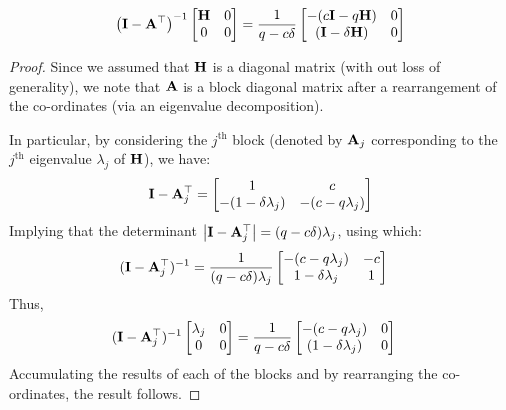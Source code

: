 \begin{lemma}\label{lem:com3}
	\begin{align*}
	{\left(\mathbf{I}- \mathbf{A}^{\top}\right)}^{-1} \begin{bmatrix}
	\mathbf{H} & 0 \\ 0 & 0
	\end{bmatrix} = \frac{1}{q-c\delta}\begin{bmatrix}-(c\mathbf{I}-q\mathbf{H})&0\\(\mathbf{I}-\delta\mathbf{H})&0\end{bmatrix}
	\end{align*}
\end{lemma}
\begin{proof}
Since we assumed that $\mathbf{H}$ is a diagonal matrix (with out loss of generality), we note that $\mathbf{A}$ is a block diagonal matrix after a rearrangement of the co-ordinates (via an eigenvalue decomposition).

In particular, by considering the $j^{\text{th}}$ block (denoted by $\mathbf{A}_j$ corresponding to the $j^{\textrm{th}}$ eigenvalue $\lambda_j$ of $\mathbf{H}$), we have:
\begin{align*}
\mathbf{I}-\mathbf{A}_j^{\top}=\begin{bmatrix} 1 & c \\ -(1-\delta\lambda_j) & -(c-q\lambda_j)\end{bmatrix}
\end{align*}
Implying that the determinant $\left|\mathbf{I}-\mathbf{A}_j^{\top}\right|=(q-c\delta)\lambda_j$, using which:
\begin{align}
\label{eq:ATInv}
(\mathbf{I}-\mathbf{A}_j^{\top})^{-1}&=\frac{1}{(q-c\delta)\lambda_j}\begin{bmatrix}-(c-q\lambda_j)&-c\\1-\delta\lambda_j&1\end{bmatrix}
\end{align}
Thus, 
\begin{align*}
(\mathbf{I}-\mathbf{A}_j^{\top})^{-1}\begin{bmatrix}\lambda_j&0\\0&0\end{bmatrix}&=\frac{1}{q-c\delta}\begin{bmatrix}-(c-q\lambda_j)&0\\(1-\delta\lambda_j)&0 \end{bmatrix}
\end{align*}
Accumulating the results of each of the blocks and by rearranging the co-ordinates, the result follows.
\end{proof}

